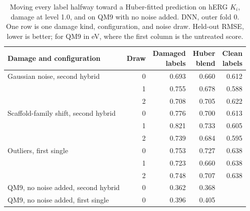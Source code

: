 \begin{table}[htbp]
\centering
\begin{tabular}{@{}lrrrr@{}}
\toprule
Damage and configuration & Draw & \makecell[r]{Damaged\\labels} & \makecell[r]{Huber\\blend} & \makecell[r]{Clean\\labels} \\
\midrule
Gaussian noise, second hybrid & 0 & 0.693 & 0.660 & 0.612 \\
 & 1 & 0.755 & 0.678 & 0.588 \\
 & 2 & 0.708 & 0.705 & 0.622 \\
Scaffold-family shift, second hybrid & 0 & 0.776 & 0.700 & 0.613 \\
 & 1 & 0.821 & 0.733 & 0.605 \\
 & 2 & 0.739 & 0.684 & 0.595 \\
Outliers, first single & 0 & 0.753 & 0.727 & 0.638 \\
 & 1 & 0.723 & 0.660 & 0.638 \\
 & 2 & 0.748 & 0.707 & 0.638 \\
\midrule
QM9, no noise added, second hybrid & 0 & 0.362 & 0.368 &  \\
QM9, no noise added, first single & 0 & 0.396 & 0.405 &  \\
\bottomrule
\end{tabular}
\caption[Moving every label toward a Huber-fitted prediction.]{Moving every label halfway toward a Huber-fitted prediction on hERG $K_i$, damage at level 1.0, and on QM9 with no noise added. DNN, outer fold 0. One row is one damage kind, configuration, and noise draw. Held-out RMSE, lower is better; for QM9 in eV, where the first column is the untreated score.}
\label{tab:noise:res:huber_blend}
\end{table}

